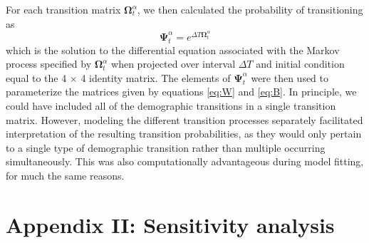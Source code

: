 For each transition matrix $\boldsymbol\Omega^{\alpha}_t$, 
we then calculated the probability of transitioning as
%
\begin{equation} \label{eq:Psi}
\boldsymbol\Psi^{\alpha}_t = e^{\Delta T\boldsymbol\Omega^{\alpha}_t}
\end{equation}
%
which is the solution to the differential equation associated with the Markov process
specified by $\boldsymbol\Omega^{\alpha}_t$ 
when projected over interval $\Delta T$ 
and initial condition equal to the 4 $\times$ 4 identity matrix.
The elements of $\boldsymbol\Psi^{\alpha}_t$ were then used to parameterize
the matrices given by equations \ref{eq:W} and \ref{eq:B}.
In principle, we could have included all of the demographic transitions in a single
transition matrix. 
However, modeling the different transition processes separately facilitated interpretation
of the resulting transition probabilities, as they would only pertain to a single type 
of demographic transition rather than multiple occurring simultaneously.
This was also computationally advantageous during model fitting, 
for much the same reasons.



\section*{Appendix II: Sensitivity analysis} 

